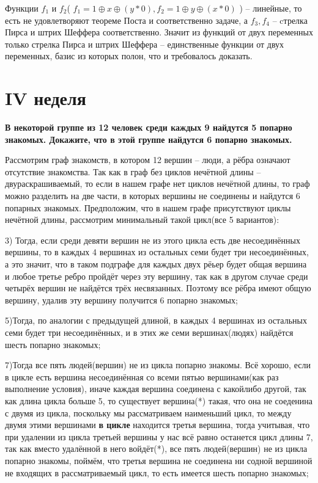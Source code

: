 \documentclass[a4paper,11pt]{article}
\begin{document}
 Функции $f_1$ и $f_2$( $f_1 = 1 \oplus x \oplus(y*0), f_2 = 1 \oplus y \oplus (x*0)  $ ) -- линейные, то есть не удовлетворяют теореме Поста и соответственно задаче, а $f_3, f_4$ -- cтрелка Пирса и штрих Шеффера соответственно. Значит из функций от двух переменных только стрелка Пирса и штрих Шеффера -- единственные функции от двух переменных, базис из которых полон, что и требовалось доказать.

 \section*{IV неделя}
 \textbf{В некоторой группе из 12 человек среди каждых 9 найдутся 5 попарно знакомых. Докажите, что в этой группе найдутся 6 попарно знакомых.}
 
 Рассмотрим граф знакомств, в котором 12 вершин -- люди, а рёбра означают отсутствие знакомства. Так как в граф без циклов нечётной длины --двураскрашиваемый, то если в нашем графе нет циклов нечётной длины, то граф можно разделить на две части, в которых вершины не соединены и найдутся 6 попарных знакомых. Предположим, что в нашем графе присутствуют циклы нечётной длины, рассмотрим минимальный такой цикл(все 5 вариантов):
 
 3)  Тогда, если среди девяти вершин не из этого цикла есть две несоединённых вершины, то в каждых 4 вершинах из остальных семи будет три несоединённых, а это значит, что в таком подграфе для каждых двух рёьер будет общая вершина и любое третье ребро пройдёт через эту вершину, так как в другом случае среди четырёх вершин не найдётся трёх несвязанных. Поэтому все рёбра имеют общую вершину, удалив эту вершину получится 6 попарно знакомых;
 
 5)Тогда, по аналогии с предыдущей длиной, в каждых 4 вершинах из остальных семи будет три несоединённых, и в этих же семи вершинах(людях) найдётся шесть попарно знакомых;
 
 7)Тогда все пять людей(вершин) не из цикла попарно знакомы. Всё хорошо, если в цикле есть вершина несоединённая со всеми пятью вершинами(как раз выполнение условия), иначе каждая вершина соединена с какойлибо другой, так как длина цикла больше 5, то существует вершина(*) такая, что она не соеденина с двумя из цикла, поскольку мы рассматриваем наименьший цикл, то между двумя этими вершинами \textbf{в цикле} находится третья вершина, тогда учитывая, что при удалении из цикла третьей вершины у нас всё равно останется цикл длины 7, так как вместо удалённой в него войдёт(*), все пять людей(вершин) не из цикла попарно знакомы, поймём, что третья вершина не соединена ни содной вершиной не входящих в рассматриваемый цикл, то есть имеется шесть попарно знакомых;
 
\end{document}
